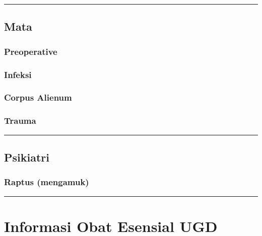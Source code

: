 \documentclass[
]{book}
\begin{document}
\begin{center}\rule{0.5\linewidth}{0.5pt}\end{center}

\hypertarget{mata}{%
\section{Mata}\label{mata}}

\hypertarget{preoperative-2}{%
\subsection{Preoperative}\label{preoperative-2}}

\hypertarget{infeksi-5}{%
\subsection{Infeksi}\label{infeksi-5}}

\hypertarget{corpus-alienum-1}{%
\subsection{Corpus Alienum}\label{corpus-alienum-1}}

\hypertarget{trauma-2}{%
\subsection{Trauma}\label{trauma-2}}

\begin{center}\rule{0.5\linewidth}{0.5pt}\end{center}

\hypertarget{psikiatri}{%
\section{Psikiatri}\label{psikiatri}}

\hypertarget{raptus-mengamuk}{%
\subsection{Raptus (mengamuk)}\label{raptus-mengamuk}}

\begin{center}\rule{0.5\linewidth}{0.5pt}\end{center}

\hypertarget{informasi-obat-esensial-ugd}{%
\chapter{Informasi Obat Esensial UGD}\label{informasi-obat-esensial-ugd}}
\end{document}

